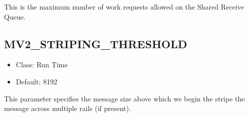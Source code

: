 This is the maximum number of work
requests allowed on the Shared
Receive Queue.

\subsection{MV2\_STRIPING\_THRESHOLD}
\label{def:nem-viadev-striping-threshold}

\begin{itemize}
    \item Class: Run Time
    \item Default: 8192
\end{itemize}

This parameter specifies the message size above which we begin the stripe the
message across multiple rails (if present).

% 
% 

%

%

